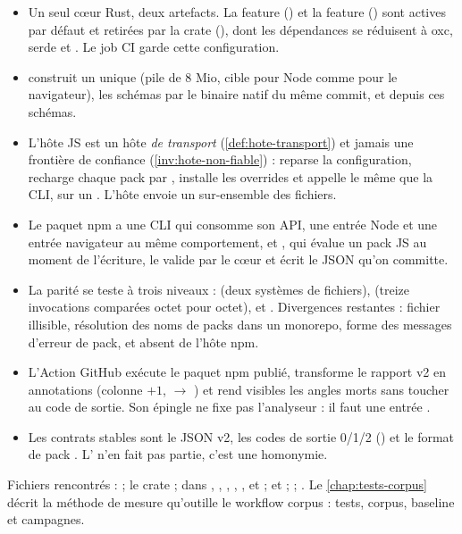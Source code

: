 \begin{resume}
\begin{itemize}
  \item Un seul cœur Rust, deux artefacts. La feature  () et la feature  () sont actives par défaut et retirées par la crate  (), dont les dépendances se réduisent à oxc, serde et . Le job CI  garde cette configuration.
  \item {} construit un unique  (pile de 8 Mio, cible  pour Node comme pour le navigateur), les schémas par le binaire natif du même commit, et  depuis ces schémas.
  \item L'hôte JS est un hôte \emph{de transport} (\cref{def:hote-transport}) et jamais une frontière de confiance (\cref{inv:hote-non-fiable}) :  reparse la configuration, recharge chaque pack par , installe les overrides et appelle le même  que la CLI, sur un . L'hôte envoie un sur-ensemble des fichiers.
  \item Le paquet npm  a une CLI qui consomme son API, une entrée Node et une entrée navigateur au même comportement, et , qui évalue un pack JS au moment de l'écriture, le valide par le cœur et écrit le JSON qu'on committe.
  \item La parité se teste à trois niveaux :  (deux systèmes de fichiers),  (treize invocations comparées octet pour octet),  et . Divergences restantes : fichier illisible, résolution des noms de packs dans un monorepo, forme des messages d'erreur de pack, et  absent de l'hôte npm.
  \item L'Action GitHub exécute le paquet npm publié, transforme le rapport v2 en annotations (colonne $+1$,  $\rightarrow$ ) et rend visibles les angles morts sans toucher au code de sortie. Son épingle ne fixe pas l'analyseur : il faut une entrée .
  \item Les contrats stables sont le JSON v2, les codes de sortie 0/1/2 () et le format de pack . L' n'en fait pas partie, c'est une homonymie.
\end{itemize}
Fichiers rencontrés :  ; le crate  ; dans , , , , ,  et  ;  et  ;  ; . Le \cref{chap:tests-corpus} décrit la méthode de mesure qu'outille le workflow corpus : tests, corpus, baseline et campagnes.
\end{resume}


